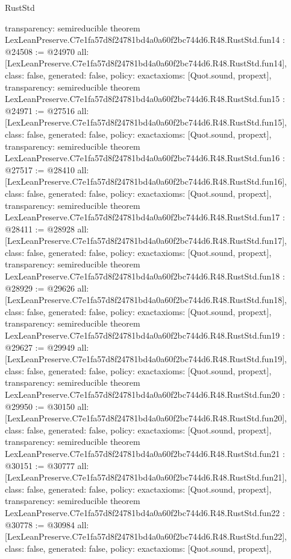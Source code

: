 \begin{lexlean}{RustStd}
\begin{coremodule}
{  transparency: semireducible
}
theorem LexLeanPreserve.C7e1fa57d8f24781bd4a0a60f2bc744d6.R48.RustStd.fun14 : @24508 := @24970 {
  all: [LexLeanPreserve.C7e1fa57d8f24781bd4a0a60f2bc744d6.R48.RustStd.fun14],
  class: false,
  generated: false,
  policy: exact{axioms: [Quot.sound, propext]},
  transparency: semireducible
}
theorem LexLeanPreserve.C7e1fa57d8f24781bd4a0a60f2bc744d6.R48.RustStd.fun15 : @24971 := @27516 {
  all: [LexLeanPreserve.C7e1fa57d8f24781bd4a0a60f2bc744d6.R48.RustStd.fun15],
  class: false,
  generated: false,
  policy: exact{axioms: [Quot.sound, propext]},
  transparency: semireducible
}
theorem LexLeanPreserve.C7e1fa57d8f24781bd4a0a60f2bc744d6.R48.RustStd.fun16 : @27517 := @28410 {
  all: [LexLeanPreserve.C7e1fa57d8f24781bd4a0a60f2bc744d6.R48.RustStd.fun16],
  class: false,
  generated: false,
  policy: exact{axioms: [Quot.sound, propext]},
  transparency: semireducible
}
theorem LexLeanPreserve.C7e1fa57d8f24781bd4a0a60f2bc744d6.R48.RustStd.fun17 : @28411 := @28928 {
  all: [LexLeanPreserve.C7e1fa57d8f24781bd4a0a60f2bc744d6.R48.RustStd.fun17],
  class: false,
  generated: false,
  policy: exact{axioms: [Quot.sound, propext]},
  transparency: semireducible
}
theorem LexLeanPreserve.C7e1fa57d8f24781bd4a0a60f2bc744d6.R48.RustStd.fun18 : @28929 := @29626 {
  all: [LexLeanPreserve.C7e1fa57d8f24781bd4a0a60f2bc744d6.R48.RustStd.fun18],
  class: false,
  generated: false,
  policy: exact{axioms: [Quot.sound, propext]},
  transparency: semireducible
}
theorem LexLeanPreserve.C7e1fa57d8f24781bd4a0a60f2bc744d6.R48.RustStd.fun19 : @29627 := @29949 {
  all: [LexLeanPreserve.C7e1fa57d8f24781bd4a0a60f2bc744d6.R48.RustStd.fun19],
  class: false,
  generated: false,
  policy: exact{axioms: [Quot.sound, propext]},
  transparency: semireducible
}
theorem LexLeanPreserve.C7e1fa57d8f24781bd4a0a60f2bc744d6.R48.RustStd.fun20 : @29950 := @30150 {
  all: [LexLeanPreserve.C7e1fa57d8f24781bd4a0a60f2bc744d6.R48.RustStd.fun20],
  class: false,
  generated: false,
  policy: exact{axioms: [Quot.sound, propext]},
  transparency: semireducible
}
theorem LexLeanPreserve.C7e1fa57d8f24781bd4a0a60f2bc744d6.R48.RustStd.fun21 : @30151 := @30777 {
  all: [LexLeanPreserve.C7e1fa57d8f24781bd4a0a60f2bc744d6.R48.RustStd.fun21],
  class: false,
  generated: false,
  policy: exact{axioms: [Quot.sound, propext]},
  transparency: semireducible
}
theorem LexLeanPreserve.C7e1fa57d8f24781bd4a0a60f2bc744d6.R48.RustStd.fun22 : @30778 := @30984 {
  all: [LexLeanPreserve.C7e1fa57d8f24781bd4a0a60f2bc744d6.R48.RustStd.fun22],
  class: false,
  generated: false,
  policy: exact{axioms: [Quot.sound, propext]},
}
\end{coremodule}
\end{lexlean}
